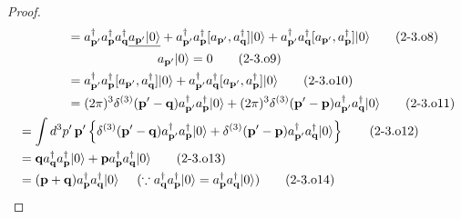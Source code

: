 \documentclass[a4paper,12pt]{article}
\begin{document}
\begin{proof}
\begin{align*}
        &\quad \hspace{1cm} = a_{\mathbf{p}'}^{\dagger} a_{\mathbf{p}}^{\dagger} a_{\mathbf{q}}^{\dagger} \underline{a_{\mathbf{p}'} \lvert 0 \rangle} + a_{\mathbf{p}'}^{\dagger} a_{\mathbf{p}}^{\dagger} [a_{\mathbf{p}'}, a_{\mathbf{q}}^{\dagger}] \lvert 0 \rangle + a_{\mathbf{p}'}^{\dagger} a_{\mathbf{q}}^{\dagger} [a_{\mathbf{p}'}, a_{\mathbf{p}}^{\dagger}] \lvert 0 \rangle \tag{2-3.o8}\\
        &\quad \hspace{3.5cm} a_{\mathbf{p}'} \lvert 0 \rangle = 0 \tag{2-3.o9}\\
        &\quad \hspace{1cm} = a_{\mathbf{p}'}^{\dagger} a_{\mathbf{p}}^{\dagger} [a_{\mathbf{p}'}, a_{\mathbf{q}}^{\dagger}] \lvert 0 \rangle + a_{\mathbf{p}'}^{\dagger} a_{\mathbf{q}}^{\dagger} [a_{\mathbf{p}'}, a_{\mathbf{p}}^{\dagger}] \lvert 0 \rangle \tag{2-3.o10}\\
        &\quad \hspace{1cm} = (2\pi)^3 \delta^{(3)}(\mathbf{p}'-\mathbf{q}) a_{\mathbf{p}'}^{\dagger} a_{\mathbf{p}}^{\dagger} \lvert 0 \rangle + (2\pi)^3 \delta^{(3)}(\mathbf{p}'-\mathbf{p}) a_{\mathbf{p}'}^{\dagger} a_{\mathbf{q}}^{\dagger} \lvert 0 \rangle \tag{2-3.o11}\\
        &= \int d^3 p' \, \mathbf{p}' \left\{ \delta^{(3)}(\mathbf{p}'-\mathbf{q}) a_{\mathbf{p}'}^{\dagger} a_{\mathbf{p}}^{\dagger} \lvert 0 \rangle + \delta^{(3)}(\mathbf{p}'-\mathbf{p}) a_{\mathbf{p}'}^{\dagger} a_{\mathbf{q}}^{\dagger} \lvert 0 \rangle \right\} \tag{2-3.o12}\\
        &= \mathbf{q} a_{\mathbf{q}}^{\dagger} a_{\mathbf{p}}^{\dagger} \lvert 0 \rangle + \mathbf{p} a_{\mathbf{p}}^{\dagger} a_{\mathbf{q}}^{\dagger} \lvert 0 \rangle \tag{2-3.o13}\\
        &= (\mathbf{p} + \mathbf{q}) a_{\mathbf{p}}^{\dagger} a_{\mathbf{q}}^{\dagger} \lvert 0 \rangle \hspace{0.5cm}(\because a_{\mathbf{q}}^{\dagger} a_{\mathbf{p}}^{\dagger} \lvert 0 \rangle = a_{\mathbf{p}}^{\dagger} a_{\mathbf{q}}^{\dagger} \lvert 0 \rangle) \tag{2-3.o14}
\end{align*}
    
\end{proof}


\color{black}
\end{document}

